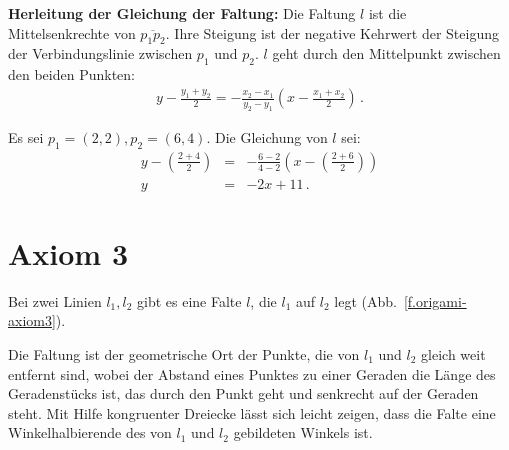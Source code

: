 \noindent\textbf{Herleitung der Gleichung der Faltung:}
Die Faltung $l$ ist die Mittelsenkrechte von $\overline{p_1p_2}$. Ihre Steigung ist der negative Kehrwert der Steigung der Verbindungslinie zwischen $p_1$ und $p_2$. $l$ geht durch den Mittelpunkt zwischen den beiden Punkten:
\begin{align}
y - \frac{y_1+y_2}{2} = -\frac{x_2-x_1}{y_2-y_1}\left(x-\frac{x_1+x_2}{2}\right)\,.\label{eq.midpoint1}
\end{align}

\begin{example}
Es sei $p_1=(2,2), p_2=(6,4)$. Die Gleichung von $l$ sei:
\begin{eqnarray*}
y-\left(\frac{2+4}{2}\right)&=&-\frac{6-2}{4-2}\left(x-\left(\frac{2+6}{2}\right)\right)\\
y&=&-2x+11\,.
\end{eqnarray*}
\end{example}


\section{Axiom 3}\label{s.ax3}


\begin{axiom}
Bei zwei Linien $l_1,l_2$ gibt es eine Falte $l$, die $l_1$ auf $l_2$ legt (Abb.~\ref{f.origami-axiom3}).
\end{axiom}
Die Faltung ist der geometrische Ort der Punkte, die von $l_1$ und $l_2$ gleich weit entfernt sind, wobei der Abstand eines Punktes zu einer Geraden die Länge des Geradenstücks ist, das durch den Punkt geht und senkrecht auf der Geraden steht. Mit Hilfe kongruenter Dreiecke lässt sich leicht zeigen, dass die Falte eine Winkelhalbierende des von $l_1$ und $l_2$ gebildeten Winkels ist.

